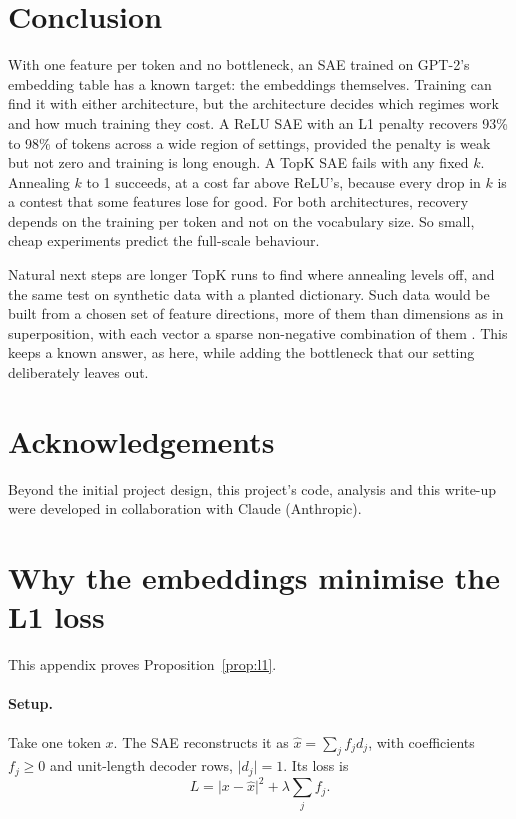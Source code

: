 \documentclass[11pt]{article}
\newcommand{\norm}[1]{\lvert #1\rvert}
\begin{document}
\section{Conclusion}

With one feature per token and no bottleneck, an SAE trained on GPT-2's embedding table has a known target: the embeddings themselves. Training can find it with either architecture, but the architecture decides which regimes work and how much training they cost. A ReLU SAE with an L1 penalty recovers 93\% to 98\% of tokens across a wide region of settings, provided the penalty is weak but not zero and training is long enough. A TopK SAE fails with any fixed $k$. Annealing $k$ to 1 succeeds, at a cost far above ReLU's, because every drop in $k$ is a contest that some features lose for good. For both architectures, recovery depends on the training per token and not on the vocabulary size. So small, cheap experiments predict the full-scale behaviour.

Natural next steps are longer TopK runs to find where annealing levels off, and the same test on synthetic data with a planted dictionary. Such data would be built from a chosen set of feature directions, more of them than dimensions as in superposition, with each vector a sparse non-negative combination of them \cite{sharkey2022taking}. This keeps a known answer, as here, while adding the bottleneck that our setting deliberately leaves out.

\section*{Acknowledgements}

Beyond the initial project design, this project's code, analysis and this write-up were developed in collaboration with Claude (Anthropic).




\clearpage
\appendix

\section{Why the embeddings minimise the L1 loss}
\label{app:l1}

This appendix proves Proposition~\ref{prop:l1}.

\paragraph{Setup.} Take one token $x$. The SAE reconstructs it as $\hat{x} = \sum_j f_j d_j$, with coefficients $f_j \ge 0$ and unit-length decoder rows, $\norm{d_j} = 1$. Its loss is
\begin{equation}
L = \norm{x - \hat{x}}^2 + \lambda \sum_j f_j .
\end{equation}
\end{document}
